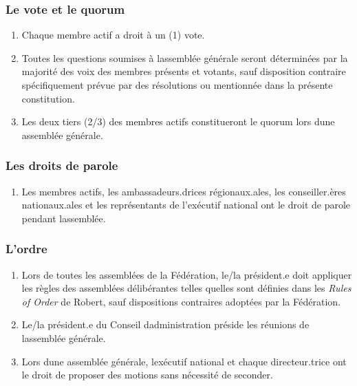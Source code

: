 \subsubsection{Le vote et le quorum}
\label{le-vote-et-le-quorum}

\begin{enumerate}
 \item
  Chaque membre actif a droit à un (1) vote.
 \item
  Toutes les questions soumises à l\textquotesingle assemblée générale seront déterminées par la majorité des voix des membres présents et votants, sauf disposition contraire spécifiquement prévue par des résolutions ou mentionnée dans la présente constitution.
 \item
  Les deux tiers (2/3) des membres actifs constitueront le quorum lors d\textquotesingle une assemblée générale.
\end{enumerate}

\subsubsection{Les droits de parole}
\label{les-droits-de-parole}

\begin{enumerate}
 \item
  Les membres actifs, les ambassadeurs.drices régionaux.ales, les conseiller.ères nationaux.ales et les représentants de l'exécutif national ont le droit de parole pendant l\textquotesingle assemblée.
\end{enumerate}

\subsubsection{L'ordre}
\label{lordre}

\begin{enumerate}
 \item
  Lors de toutes les assemblées de la Fédération, le/la président.e doit appliquer les règles des assemblées délibérantes telles qu\textquotesingle elles sont définies dans les \emph{Rules of Order} de Robert, sauf dispositions contraires adoptées par la Fédération.
 \item
  Le/la président.e du Conseil d\textquotesingle administration préside les réunions de l\textquotesingle assemblée générale.
 \item
  Lors d\textquotesingle une assemblée générale, l\textquotesingle exécutif national et chaque directeur.trice ont le droit de proposer des motions sans nécessité de seconder.
\end{enumerate}


